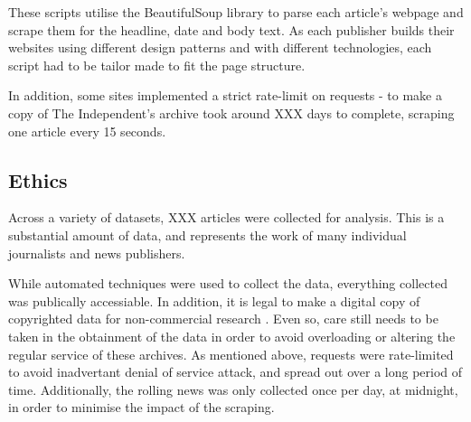 \documentclass[12pt,a4paper]{article}
\begin{document}
These scripts utilise the BeautifulSoup library to parse each article's webpage and scrape them for the headline, date and body text. As each publisher builds their websites using different design patterns and with different technologies, each script had to be tailor made to fit the page structure.

In addition, some sites implemented a strict rate-limit on requests - to make a copy of The Independent's archive took around XXX days to complete, scraping one article every 15 seconds. 

\subsection{Ethics}
Across a variety of datasets, XXX articles were collected for analysis. This is a substantial amount of data, and represents the work of many individual journalists and news publishers. 

While automated techniques were used to collect the data, everything collected was publically accessiable. In addition, it is legal to make a digital copy of copyrighted data for non-commercial research \cite{web_govcopyright}. Even so, care still needs to be taken in the obtainment of the data in order to avoid overloading or altering the regular service of these archives. As mentioned above, requests were rate-limited to avoid inadvertant denial of service attack, and spread out over a long period of time. Additionally, the rolling news was only collected once per day, at midnight, in order to minimise the impact of the scraping.




\end{document}
